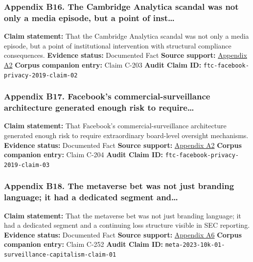 \documentclass[
  american,
  11pt,
  letterpaper,
]{article}
\begin{document}
\subsubsection{Appendix B16. The Cambridge Analytica scandal was not
only a media episode, but a point of
inst\ldots{}}\label{ch-01-appendix-b16-the-cambridge-analytica-scandal-was-not-only-a-media-episode-but-a-point-of-inst}

\textbf{Claim statement:} That the Cambridge Analytica scandal was not
only a media episode, but a point of institutional intervention with
structural compliance consequences. \textbf{Evidence status:} Documented
Fact \textbf{Source support:}
\hyperref[ch-01-appendix-a2-ftc-imposes-5-billion-penalty-and-sweeping-new-privacy-restrictions-on-facebook]{Appendix
A2} \textbf{Corpus companion entry:} Claim C-203 \textbf{Audit Claim
ID:} \texttt{ftc-facebook-privacy-2019-claim-02}

\subsubsection{Appendix B17. Facebook's commercial-surveillance
architecture generated enough risk to
require\ldots{}}\label{ch-01-appendix-b17-facebooks-commercial-surveillance-architecture-generated-enough-risk-to-require}

\textbf{Claim statement:} That Facebook's commercial-surveillance
architecture generated enough risk to require extraordinary board-level
oversight mechanisms. \textbf{Evidence status:} Documented Fact
\textbf{Source support:}
\hyperref[ch-01-appendix-a2-ftc-imposes-5-billion-penalty-and-sweeping-new-privacy-restrictions-on-facebook]{Appendix
A2} \textbf{Corpus companion entry:} Claim C-204 \textbf{Audit Claim
ID:} \texttt{ftc-facebook-privacy-2019-claim-03}

\subsubsection{Appendix B18. The metaverse bet was not just branding
language; it had a dedicated segment
and\ldots{}}\label{ch-01-appendix-b18-the-metaverse-bet-was-not-just-branding-language-it-had-a-dedicated-segment-and}

\textbf{Claim statement:} That the metaverse bet was not just branding
language; it had a dedicated segment and a continuing loss structure
visible in SEC reporting. \textbf{Evidence status:} Documented Fact
\textbf{Source support:}
\hyperref[ch-01-appendix-a6-meta-platforms-inc-2023-annual-report-form-10-k]{Appendix
A6} \textbf{Corpus companion entry:} Claim C-252 \textbf{Audit Claim
ID:} \texttt{meta-2023-10k-01-surveillance-capitalism-claim-01}
\end{document}
